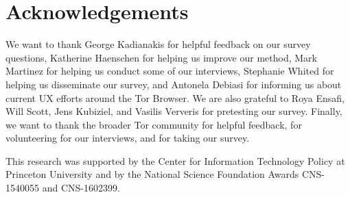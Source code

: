 \section*{Acknowledgements}
We want to thank George Kadianakis for helpful feedback on our survey questions,
Katherine Haenschen for helping us improve our method, Mark Martinez for helping
us conduct some of our interviews, Stephanie Whited for helping us disseminate
our survey, and Antonela Debiasi for informing us about current UX efforts
around the Tor Browser.  We are also grateful to Roya Ensafi, Will Scott, Jens
Kubiziel, and Vasilis Ververis for pretesting our survey.  Finally, we want to
thank the broader Tor community for helpful feedback, for volunteering for our
interviews, and for taking our survey.

This research was supported by the Center for Information Technology Policy at
Princeton University and by the National Science Foundation Awards CNS-1540055
and CNS-1602399.
